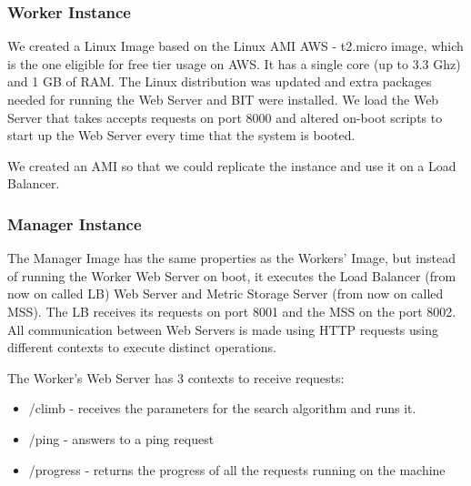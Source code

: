 \documentclass[times, 10pt,twocolumn]{article}
\begin{document}
\subsubsection{Worker Instance}
   We created a Linux Image based on the Linux AMI AWS - t2.micro image, 
   which is the one eligible for free tier usage on AWS. It has a single core
   (up to 3.3 Ghz) and 1 GB of RAM. The Linux distribution was updated and
   extra packages needed for running the Web Server and BIT were installed.
   We load the Web Server that takes accepts requests on port 8000 and 
   altered on-boot scripts to start up the Web Server every time that
   the system is booted.

   We created an AMI so that we could replicate the instance and use it 
   on a Load Balancer. 

\subsubsection{Manager Instance} 
   The Manager Image has the same properties as the Workers' Image, but 
   instead of running the Worker Web Server on boot, it executes the Load Balancer
   (from now on called LB) Web Server and Metric Storage Server (from now on 
   called MSS). The LB receives its requests on port 8001 and the MSS on the
   port 8002. All communication between Web Servers is made using HTTP requests
   using different contexts to execute distinct operations.
   
   The Worker's Web Server has 3 contexts to receive requests:
   \begin{itemize}
      \item /climb - receives the parameters for the search algorithm and runs it. 
      \item /ping - answers to a ping request 
      \item /progress - returns the progress of all the requests running on the machine
   \end{itemize}
   
\end{document}
